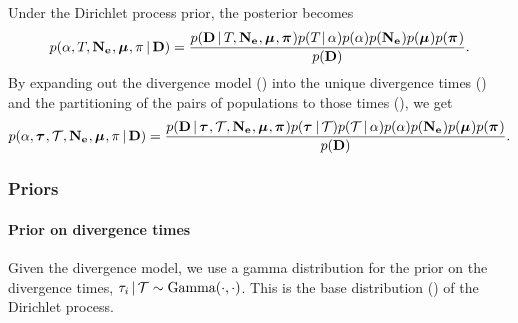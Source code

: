 Under the Dirichlet process prior, the posterior becomes
\begin{equation}
    \pr(
    \concentration,
    \divtimemodel,
    \collectionpopsizes,
    \murates,
    \gfreq
    \given
    \alldata
    )
    =
    \frac{
        \pr(
        \alldata
        \given
        \divtimemodel,
        \collectionpopsizes,
        \murates,
        \gfreqs
        )
        \pr(\divtimemodel \given \concentration)
        \pr(\concentration)
        \pr(\collectionpopsizes)
        \pr(\murates)
        \pr(\gfreqs)
    }{
        \pr(
        \alldata
        )
    }.
    \label{eq:bayesrule}
\end{equation}
By expanding out the divergence model (\divtimemodel) into the
unique divergence times (\divtimes) and the partitioning of the pairs of populations
to those times (\divtimesets), we get
\begin{equation}
    \pr(
    \concentration,
    \divtimes,
    \divtimesets,
    \collectionpopsizes,
    \murates,
    \gfreq
    \given
    \alldata
    )
    =
    \frac{
        \pr(
        \alldata
        \given
        \divtimes,
        \divtimesets,
        \collectionpopsizes,
        \murates,
        \gfreqs
        )
        \pr(\divtimes \given \divtimesets)
        \pr(\divtimesets \given \concentration)
        \pr(\concentration)
        \pr(\collectionpopsizes)
        \pr(\murates)
        \pr(\gfreqs)
    }{
        \pr(
        \alldata
        )
    }.
    \label{eq:bayesruleexpanded}
\end{equation}

\subsubsection{Priors}

\paragraph{Prior on divergence times}
Given the divergence model, we use a gamma distribution for the prior on the
divergence times,
$\divtime[i] \given \divtimesets \sim \textrm{Gamma}(\cdot, \cdot)$.
This is the base distribution (\basedistribution) of the Dirichlet process.

